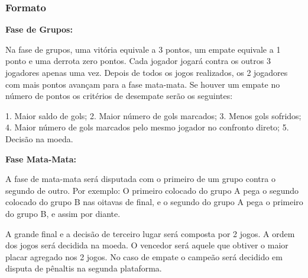 \subsubsection{Formato}

\textbf{Fase de Grupos:}

Na fase de grupos, uma vitória equivale a 3 pontos, um empate equivale a
1 ponto e uma derrota zero pontos. Cada jogador jogará contra os outros 3
jogadores apenas uma vez. Depois de todos os jogos realizados, os 2 jogadores
com mais pontos avançam para a fase mata-mata. Se houver um empate no
número de pontos os critérios de desempate serão os seguintes:

1. Maior saldo de gols;
2. Maior número de gols marcados;
3. Menos gols sofridos;
4. Maior número de gols marcados pelo mesmo jogador no confronto
direto;
5. Decisão na moeda.

\textbf{Fase Mata-Mata:}

A fase de mata-mata será disputada com o primeiro de um grupo contra o
segundo de outro. Por exemplo: O primeiro colocado do grupo A pega o segundo
colocado do grupo B nas oitavas de final, e o segundo do grupo A pega o primeiro
do grupo B, e assim por diante.

A grande final e a decisão de terceiro lugar será composta por 2 jogos. A
ordem dos jogos será decidida na moeda. O vencedor será aquele que obtiver o
maior placar agregado nos 2 jogos. No caso de empate o campeão será decidido
em disputa de pênaltis na segunda plataforma.